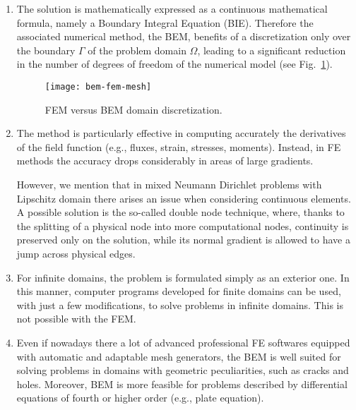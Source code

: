 \begin{enumerate}
  \item The solution is mathematically expressed as a continuous mathematical formula, namely a Boundary Integral Equation (BIE). Therefore the associated numerical method, the BEM, benefits of a discretization only over the boundary $\Gamma$ of the problem domain $\Omega$, leading to a significant reduction in the number of degrees of freedom of the numerical model (see Fig.~\ref{fig:bem-fem-mesh}).

  \begin{figure}
  \begin{center}
    \texttt{[image: bem-fem-mesh]}    %
    \caption{FEM versus BEM domain discretization.} 
    \label{fig:bem-fem-mesh}
  \end{center}
  \end{figure}

  \item The method is particularly effective in computing accurately the derivatives of the field function (e.g., fluxes, strain, stresses, moments).  Instead, in FE methods the accuracy drops considerably in areas of large gradients.

  However, we mention that in mixed Neumann Dirichlet problems with Lipschitz domain there arises an issue when considering continuous elements. A possible solution is the so-called double node technique, where, thanks to the splitting of a physical node into more computational nodes, continuity is preserved only on the solution, while its normal gradient is allowed to have a jump across physical edges.

  \item For infinite domains, the problem is formulated simply as an exterior one. In this manner, computer programs developed for finite domains can be used, with just a few modifications, to solve problems in infinite domains. This is not possible with the FEM.

  \item Even if nowadays there a lot of advanced professional FE softwares equipped with automatic and adaptable mesh generators, the BEM is well suited for solving problems in domains with geometric peculiarities, such as cracks and holes. Moreover, BEM is more feasible for problems described by differential equations of fourth or higher order (e.g., plate equation).
\end{enumerate}

